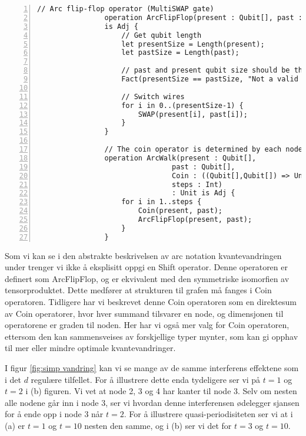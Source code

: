             \begin{Verbatim}[gobble=2, numbers=left, frame=lines,
                framesep=3mm,
                label={[Beginning of code]End of code}]
                // Arc flip-flop operator (MultiSWAP gate)
                operation ArcFlipFlop(present : Qubit[], past : Qubit[]) : Unit
                is Adj {
                    // Get qubit length
                    let presentSize = Length(present);
                    let pastSize = Length(past);

                    // past and present qubit size should be the same
                    Fact(presentSize == pastSize, "Not a valid format");

                    // Switch wires
                    for i in 0..(presentSize-1) {
                        SWAP(present[i], past[i]);
                    }
                }

                // The coin operator is determined by each nodes neighbors
                operation ArcWalk(present : Qubit[], 
                                past : Qubit[], 
                                Coin : ((Qubit[],Qubit[]) => Unit is Adj), 
                                steps : Int) 
                                : Unit is Adj {
                    for i in 1..steps {
                        Coin(present, past);
                        ArcFlipFlop(present, past);
                    }
                }
            \end{Verbatim}

            Som vi kan se i den abstrakte beskrivelsen av arc notation kvantevandringen under trenger vi ikke å eksplisitt oppgi en Shift operator. Denne operatoren er definert som ArcFlipFlop, og er ekvivalent med den symmetriske isomorfien av tensorproduktet. Dette medfører at strukturen til grafen må fanges i Coin operatoren. Tidligere har vi beskrevet denne Coin operatoren som en direktesum av Coin operatorer, hvor hver summand tilsvarer en node, og dimensjonen til operatorene er graden til noden. Her har vi også mer valg for Coin operatoren, ettersom den kan sammensveises av forskjellige typer mynter, som kan gi opphav til mer eller mindre optimale kvantevandringer.

            I figur \ref{fig:simp vandring} kan vi se mange av de samme interferens effektene som i det $d$ regulære tilfellet. For å illustrere dette enda tydeligere ser vi på $t = 1$ og $t = 2$ i (b) figuren. Vi vet at node 2, 3 og 4 har kanter til node 3. Selv om nesten alle nodene går inn i node 3, ser vi hvordan denne interferensen ødelegger sjansen for å ende opp i node 3 når $t = 2$. For å illustrere quasi-periodisiteten ser vi at i (a) er $t = 1$ og $t = 10$ nesten den samme, og i (b) ser vi det for $t = 3$ og $t = 10$.

